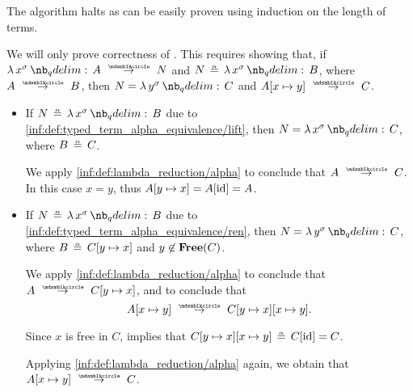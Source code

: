 \begin{defproof}
  The algorithm halts as can be easily proven using induction on the length of terms.

  We will only prove correctness of . This requires showing that, if \( \qabs {x^\sigma} A \pred N \) and \( N \aequiv \qabs {x^\sigma} B \), where \( A \pred B \), then \( N = \qabs {y^\sigma} C \) and \( A[x \mapsto y] \pred C \).

  \begin{itemize}
    \item If \( N \aequiv \qabs {x^\sigma} B \) due to \ref{inf:def:typed_term_alpha_equivalence/lift}, then \( N = \qabs {x^\sigma} C \), where \( B \aequiv C \).

    We apply \ref{inf:def:lambda_reduction/alpha} to conclude that \( A \pred C \). In this case \( x = y \), thus \( A[y \mapsto x] = A[\operatorname{id}] = A \).

    \item If \( N \aequiv \qabs {x^\sigma} B \) due to \ref{inf:def:typed_term_alpha_equivalence/ren}, then \( N = \qabs {y^\sigma} C \), where \( B \aequiv C[y \mapsto x] \) and \( y \not\in \op*{Free}(C) \).

    We apply \ref{inf:def:lambda_reduction/alpha} to conclude that \( A \pred C[y \mapsto x] \), and  to conclude that
    \begin{equation*}
      A[x \mapsto y] \pred C[y \mapsto x][x \mapsto y].
    \end{equation*}

    Since \( x \) is free in \( C \),  implies that \( C[y \mapsto x][x \mapsto y] \aequiv C[\id] = C \).

    Applying \ref{inf:def:lambda_reduction/alpha} again, we obtain that \( A[x \mapsto y] \pred C \).
  \end{itemize}
\end{defproof}

